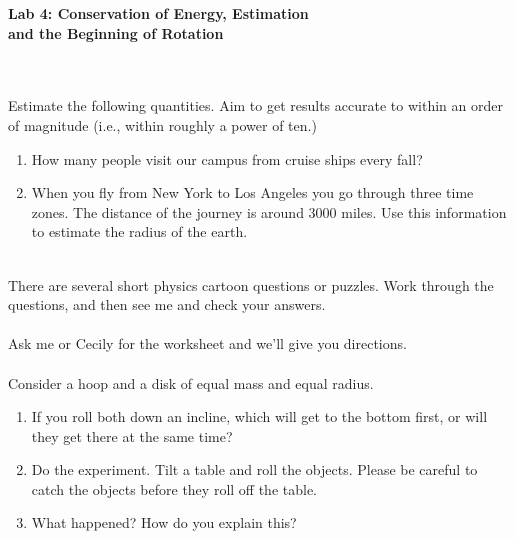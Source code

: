 \documentclass[12pt]{article}
\begin{document}
\pagestyle{empty}

\begin{center}
{\large {\bf Lab 4: Conservation of Energy, Estimation}}\\
\smallskip 
{\large {\bf and the Beginning of Rotation}}\\
\end{center}

\hspace{2mm}\\

\\

\noindent Estimate the following quantities.  Aim to get results
accurate to within an order of magnitude (i.e., within roughly a power
of ten.)
\begin{enumerate}
  \setlength{\itemsep}{-1mm}
     \item How many people visit our campus from cruise ships every
     fall?   
     \item When you fly from New York to Los Angeles you go through
     three time zones.  The distance of the journey is around $3000$
     miles.  Use this information to estimate the radius of the
     earth.  \\
\end{enumerate}

\\

\noindent There are several short physics cartoon questions or
puzzles. Work through the questions, and then see me and check your
answers. \\



\\

\noindent Ask me or Cecily for the worksheet and we'll give you
directions.\\ 

\\

\noindent  Consider a hoop and a disk of equal mass and equal radius.
\begin{enumerate}
\setlength{\itemsep}{-1mm}
  \item If you roll both down an incline, which will get to the bottom
  first, or will they get there at the same time?

  \item Do the experiment.  Tilt a table and roll the objects.  Please
  be careful to catch the objects before they roll off the table.

  \item What happened?  How do you explain this?
\end{enumerate}
\end{document}

